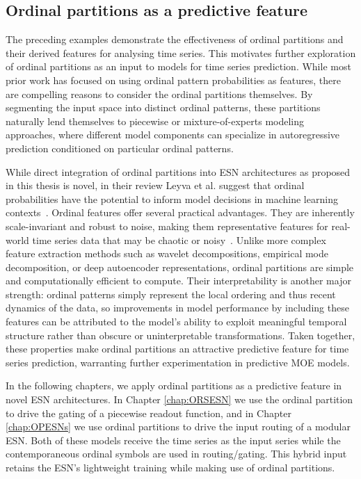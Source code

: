 \subsection{Ordinal partitions as a predictive feature}

The preceding examples demonstrate the effectiveness of ordinal partitions and their derived features for analysing time series. This motivates further exploration of ordinal partitions as an input to models for time series prediction. While most prior work has focused on using ordinal pattern probabilities as features, there are compelling reasons to consider the ordinal partitions themselves. By segmenting the input space into distinct ordinal patterns, these partitions naturally lend themselves to piecewise or mixture-of-experts modeling approaches, where different model components can specialize in autoregressive prediction conditioned on particular ordinal patterns.

While direct integration of ordinal partitions into ESN architectures as proposed in this thesis is novel, in their review Leyva et al. suggest that ordinal probabilities have the potential to inform model decisions in machine learning contexts~\cite{leyva_2022}. Ordinal features offer several practical advantages. They are inherently scale-invariant and robust to noise, making them representative features for real-world time series data that may be chaotic or noisy~\cite{bandt_pompe_2002}. Unlike more complex feature extraction methods such as wavelet decompositions, empirical mode decomposition, or deep autoencoder representations, ordinal partitions are simple and computationally efficient to compute. Their interpretability is another major strength: ordinal patterns simply represent the local ordering and thus recent dynamics of the data, so improvements in model performance by including these features can be attributed to the model's ability to exploit meaningful temporal structure rather than obscure or uninterpretable transformations. Taken together, these properties make ordinal partitions an attractive predictive feature for time series prediction, warranting further experimentation in predictive MOE models.

In the following chapters, we apply ordinal partitions as a predictive feature in novel ESN architectures. In Chapter \ref{chap:ORSESN} we use the ordinal partition to drive the gating of a piecewise readout function, and in Chapter \ref{chap:OPESNs} we use ordinal partitions to drive the input routing of a modular ESN. Both of these models receive the time series as the input series while the contemporaneous ordinal symbols are used in routing/gating. This hybrid input retains the ESN's lightweight training while making use of ordinal partitions.